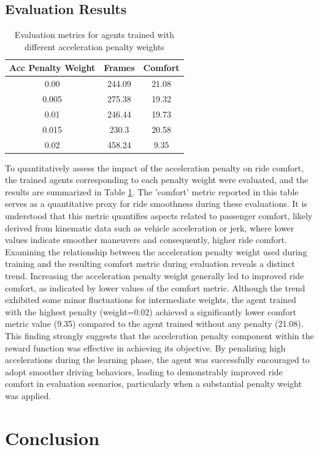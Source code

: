 \documentclass[12pt,a4paper]{article}
\begin{document}
\subsection{Evaluation Results}

\begin{table}[ht]
\centering
\begin{tabular}{|c|c|c|}
\hline
\textbf{Acc Penalty Weight} & \textbf{Frames} & \textbf{Comfort}  \\
\hline
0.00 & 244.09 & 21.08 \\
0.005 & 275.38 & 19.32 \\
0.01 & 246.44 & 19.73 \\
0.015 & 230.3 & 20.58 \\
0.02 & 458.24 & 9.35 \\
\hline
\end{tabular}
\caption{Evaluation metrics for agents trained with different acceleration penalty weights}
\label{tab:evaluation_results}
\end{table}

To quantitatively assess the impact of the acceleration penalty on ride comfort, the trained agents corresponding to each penalty weight were evaluated, and the results are summarized in Table \ref{tab:evaluation_results}. The 'comfort' metric reported in this table serves as a quantitative proxy for ride smoothness during these evaluations. It is understood that this metric quantifies aspects related to passenger comfort, likely derived from kinematic data such as vehicle acceleration or jerk, where lower values indicate smoother maneuvers and consequently, higher ride comfort. Examining the relationship between the acceleration penalty weight used during training and the resulting comfort metric during evaluation reveals a distinct trend. Increasing the acceleration penalty weight generally led to improved ride comfort, as indicated by lower values of the comfort metric. Although the trend exhibited some minor fluctuations for intermediate weights, the agent trained with the highest penalty (weight=0.02) achieved a significantly lower comfort metric value (9.35) compared to the agent trained without any penalty (21.08). This finding strongly suggests that the acceleration penalty component within the reward function was effective in achieving its objective. By penalizing high accelerations during the learning phase, the agent was successfully encouraged to adopt smoother driving behaviors, leading to demonstrably improved ride comfort in evaluation scenarios, particularly when a substantial penalty weight was applied.

\section{Conclusion}





\end{document}
